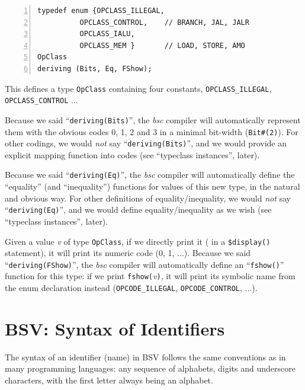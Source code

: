 \begin{Verbatim}[frame=single, numbers=left]
typedef enum {OPCLASS_ILLEGAL,
	      OPCLASS_CONTROL,    // BRANCH, JAL, JALR
	      OPCLASS_IALU,
	      OPCLASS_MEM }       // LOAD, STORE, AMO
OpClass
deriving (Bits, Eq, FShow);
\end{Verbatim}

This defines a type \verb|OpClass| containing four constants,
\verb|OPCLASS_ILLEGAL|, \verb|OPCLASS_CONTROL| ...


Because we said ``\verb|deriving(Bits)|'', the \emph{bsc} compiler
will automatically represent them with the obvious codes 0, 1, 2 and 3
in a minimal bit-width (\verb|Bit#(2)|).  For other codings, we would
\emph{not} say ``\verb|deriving(Bits)|'', and we would provide an
explicit mapping function into codes (see ``typeclass instances'',
later).


Because we said ``\verb|deriving(Eq)|'', the \emph{bsc} compiler will
automatically define the ``equality'' (and ``inequality'') functions
for values of this new type, in the natural and obvious way.  For
other definitions of equality/inequality, we would \emph{not} say
``\verb|deriving(Eq)|'', and we would define equality/inequality as we
wish (see ``typeclass instances'', later).


Given a value \emph{v} of type \verb|OpClass|, if we directly print it
({\eg} in a \verb|$display()| statement), it will print its numeric
code (0, 1, ...).  Because we said ``\verb|deriving(FShow)|'', the
\emph{bsc} compiler will automatically define an ``\verb|fshow()|''
function for this type: if we print \verb|fshow(|\emph{v}\verb|)|, it
will print its symbolic name from the enum declaration instead
(\verb|OPCODE_ILLEGAL|, \verb|OPCODE_CONTROL|, ...).


\section{BSV: Syntax of Identifiers}

\label{BSV_Syntax_of_Identifiers}


The syntax of an identifier (name) in BSV follows the same conventions
as in many programming languages: any sequence of alphabets, digits
and underscore characters, with the first letter always being an
alphabet.

